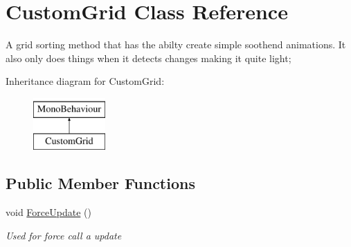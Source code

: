 \hypertarget{class_custom_grid}{}\section{Custom\+Grid Class Reference}
\label{class_custom_grid}


A grid sorting method that has the abilty create simple soothend animations. It also only does things when it detects changes making it quite light;  


Inheritance diagram for Custom\+Grid\+:\begin{figure}[H]
\begin{center}
\leavevmode
\includegraphics[height=2.000000cm]{class_custom_grid}
\end{center}
\end{figure}
\subsection*{Public Member Functions}
\begin{DoxyCompactItemize}
\item 
void \hyperlink{class_custom_grid_a1b2b4541146de94aaead99bca2f78d7f}{Force\+Update} ()
\begin{DoxyCompactList}\small\item\em Used for force call a update \end{DoxyCompactList}\end{DoxyCompactItemize}
